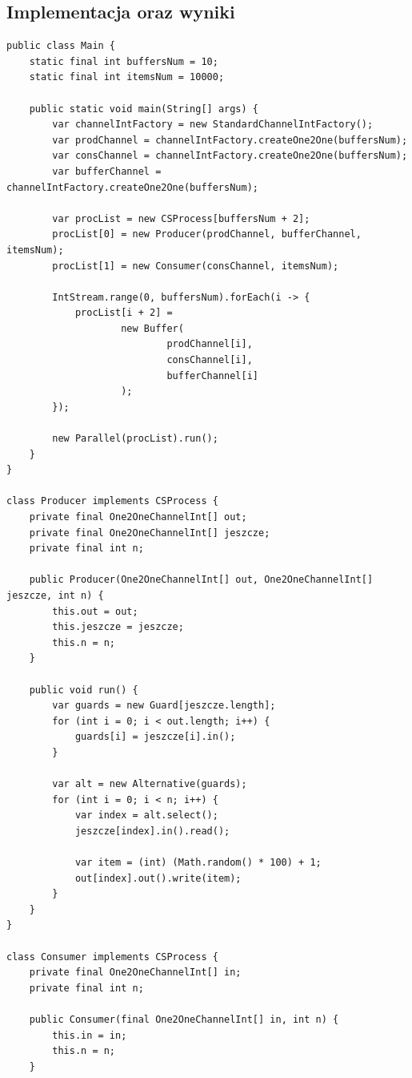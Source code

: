 \documentclass[12pt]{article}
\begin{document}
\subsection{Implementacja oraz wyniki}
\begin{verbatim}
public class Main {
    static final int buffersNum = 10;
    static final int itemsNum = 10000;

    public static void main(String[] args) {
        var channelIntFactory = new StandardChannelIntFactory();
        var prodChannel = channelIntFactory.createOne2One(buffersNum);
        var consChannel = channelIntFactory.createOne2One(buffersNum);
        var bufferChannel = channelIntFactory.createOne2One(buffersNum);

        var procList = new CSProcess[buffersNum + 2];
        procList[0] = new Producer(prodChannel, bufferChannel, itemsNum);
        procList[1] = new Consumer(consChannel, itemsNum);

        IntStream.range(0, buffersNum).forEach(i -> {
            procList[i + 2] =
                    new Buffer(
                            prodChannel[i],
                            consChannel[i],
                            bufferChannel[i]
                    );
        });

        new Parallel(procList).run();
    }
}

class Producer implements CSProcess {
    private final One2OneChannelInt[] out;
    private final One2OneChannelInt[] jeszcze;
    private final int n;

    public Producer(One2OneChannelInt[] out, One2OneChannelInt[] jeszcze, int n) {
        this.out = out;
        this.jeszcze = jeszcze;
        this.n = n;
    }

    public void run() {
        var guards = new Guard[jeszcze.length];
        for (int i = 0; i < out.length; i++) {
            guards[i] = jeszcze[i].in();
        }

        var alt = new Alternative(guards);
        for (int i = 0; i < n; i++) {
            var index = alt.select();
            jeszcze[index].in().read();

            var item = (int) (Math.random() * 100) + 1;
            out[index].out().write(item);
        }
    }
}

class Consumer implements CSProcess {
    private final One2OneChannelInt[] in;
    private final int n;

    public Consumer(final One2OneChannelInt[] in, int n) {
        this.in = in;
        this.n = n;
    }


\end{verbatim}
\end{document}
